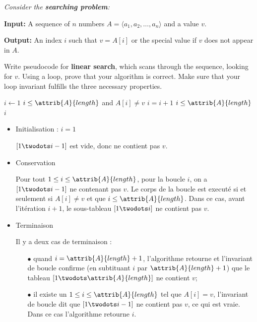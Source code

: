 \begin{description}
 {\itshape Consider the {\bfseries searching problem}:

  {\bfseries Input:} A sequence of $n$ numbers $A = \langle a_1, a_2, \ldots, a_n \rangle$ and a value $v$.

  {\bfseries Output:} An index $i$ such that $v = A[i]$ or the special value  if $v$ does not appear in $A$.

Write pseudocode for {\bfseries linear search}, which scans through the sequence, looking for $v$. Using a loop, prove that your algorithm is correct. Make sure that your loop invariant fulfills the three necessary properties.}
  \begin{ex}
  \begin{codebox}
    \li $i\gets1$
    \li \While $i \le \attrib{A}{length}$ and $A[i]\ne v$
    \li \Do $i = i+1$ \End
    \li \If $i \le \attrib{A}{length}$ 
    \li \Then \Return $i$
    \li \Else
    \li \Return {}
    \End
    \end{codebox}
\begin{itemize}
  \item Initialisation : $i = 1$

    $[1 \twodots i-1]$ est vide, donc ne contient pas $v$.
  \item Conservation

    Pour tout $1\le i\le \attrib{A}{length}$, pour la boucle $i$, on a $[1 \twodots i-1]$ ne contenant pas $v$. Le corps de la boucle est executé si et seulement si $A[i] \ne v$ et que $i \le \attrib{A}{length}$. Dans ce cas, avant l'itération $i+1$, le sous-tableau $[1 \twodots i]$ ne contient pas $v$.
  \item Terminaison

    Il y a deux cas de terminaison :
    \begin{itemize}
      \item[$\bullet$]  quand $i = \attrib{A}{length}+ 1$, l'algorithme retourne  et l'invariant de boucle confirme (en subtituant $i$ par $\attrib{A}{length}+1$) que le tableau $[1 \twodots \attrib{A}{length}]$ ne contient $v$;
      \item[$\bullet$] il existe un $1 \le i \le \attrib{A}{length}$ tel que $A[i] = v$, l'invariant de boucle dit que $[ 1 \twodots i-1]$ ne contient pas $v$, ce qui est vraie. Dans ce cas l'algorithme retourne $i$.
    \end{itemize}
\end{itemize}


\end{ex}
\end{description}
